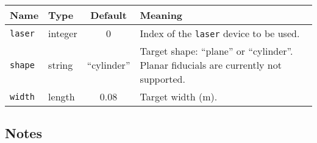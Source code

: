 \begin{center}
{\small \begin{tabularx}{\columnwidth}{|l|l|c|X|}
\hline
Name & Type & Default & Meaning\\
\hline
{\tt laser} & integer & 0 & Index of the {\tt laser} device to be used. \\
{\tt shape} & string & ``cylinder'' & Target shape: ``plane'' or ``cylinder''. 
Planar fiducials are currently not supported.\\
{\tt width} & length & 0.08 & Target width (m). \\
\hline
\end{tabularx}}
\end{center}

\subsection*{Notes}
